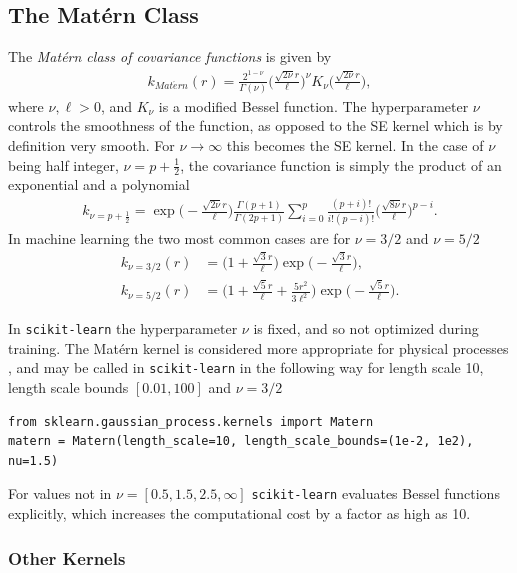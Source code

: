 \documentclass[twoside,english]{uiofysmaster}
\begin{document}
\subsection{The Mat\'{e}rn Class }

The \textit{Mat\'{e}rn class of covariance functions} is given by
\begin{align}
k_{Mat\acute{e}rn} (r) = \frac{2^{1- \nu}}{\Gamma (\nu)} \Big( \frac{\sqrt{2 \nu} r	}{\ell} \Big)^{\nu} K_{\nu} \Big( \frac{\sqrt{2 \nu}r}{\ell} \Big),
\end{align}
where $\nu, \ell > 0$, and $K_{\nu}$ is a modified Bessel function. The hyperparameter $\nu$ controls the smoothness of the function, as opposed to the SE kernel which is by definition very smooth. For $\nu \rightarrow \infty$ this becomes the SE kernel. In the case of $\nu$ being half integer, $\nu = p + \frac{1}{2}$, the covariance function is simply the product of an exponential and a polynomial
\begin{align}
k_{\nu=p+\frac{1}{2}} = \exp \Big(- \frac{\sqrt{2 \nu} r	}{\ell} \Big) \frac{\Gamma(p+1)}{\Gamma(2p + 1)} \sum^p_{i=0} \frac{(p+i)!}{i!(p-i)!} \Big( \frac{\sqrt{8 \nu} r	}{\ell} \Big)^{p-i}.
\end{align}
In machine learning the two most common cases are for $\nu = 3/2$ and $\nu = 5/2$
\begin{align}
k_{\nu = 3/2}(r) &=  \Big(1 + \frac{\sqrt{3}r}{\ell} \Big) \exp \Big( -\frac{\sqrt{3}r}{\ell} \Big),\\
k_{\nu = 5/2}(r) &=  \Big(1 + \frac{\sqrt{5}r}{\ell}  + \frac{5r^2}{3 \ell^2}\Big) \exp \Big( -\frac{\sqrt{5}r}{\ell} \Big).
\end{align}

In \verb|scikit-learn| the hyperparameter $\nu$ is fixed, and so not optimized during training. The Mat\'{e}rn kernel is considered more appropriate for physical processes \cite{rasmussen2006gaussian}, and may be called in \verb|scikit-learn| in the following way for length scale 10, length scale bounds $[0.01, 100]$ and $\nu = 3/2$
\begin{lstlisting}
from sklearn.gaussian_process.kernels import Matern
matern = Matern(length_scale=10, length_scale_bounds=(1e-2, 1e2), nu=1.5)
\end{lstlisting}
For values not in $\nu = [0.5, 1.5, 2.5, \infty]$ \verb|scikit-learn| evaluates Bessel functions explicitly, which increases the computational cost by a factor as high as 10.

\subsubsection{Other Kernels}
\end{document}
